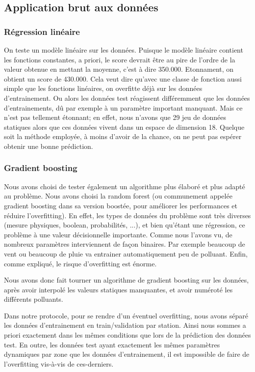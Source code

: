 \subsection{Application brut aux données}

\subsubsection{Régression linéaire}

On teste un modèle linéaire sur les données.
Puisque le modèle linéaire contient les fonctions constantes, a priori, le score devrait être au pire de l'ordre de la valeur obtenue en mettant la moyenne, c'est à dire 350.000.
Etonnament, on obtient un score de 430.000.
Cela veut dire qu'avec une classe de fonction aussi simple que les fonctions linéaires, on overfitte déjà sur les données d'entrainement. Ou alors les données test réagissent différemment que les données d'entrainements, dû par exemple à un paramètre important manquant. 
Mais ce n'est pas tellement étonnant; en effet, nous n'avons que 29 jeu de données statiques alors que ces données vivent dans un espace de dimension 18.
Quelque soit la méthode employée, à moins d'avoir de la chance, on ne peut pas espérer obtenir une bonne prédiction. %

\subsubsection{Gradient boosting}

Nous avons choisi de tester également un algorithme plus élaboré et plus adapté au problème. Nous avons choisi la random forest (ou communement appelée gradient boosting dans sa version boostée, pour améliorer les performances et réduire l'overfitting). En effet, les types de données du problème sont très diverses (mesure physiques, boolean, probabilités, ...), et bien qu'étant une régression, ce problème à une valeur décisionnelle importante. Comme nous l'avons vu, de nombreux paramètres interviennent de façon binaires. Par exemple beaucoup de vent ou beaucoup de pluie va entrainer automatiquement peu de polluant. Enfin, comme expliqué, le risque d'overfitting est énorme.

Nous avons donc fait tourner un algorithme de gradient boosting sur les données, après avoir interpolé les valeurs statiques manquantes, et avoir numéroté les différents polluants.

Dans notre protocole, pour se rendre d'un éventuel overfitting, nous avons séparé les données d'entrainement en train/validation par station. Ainsi nous sommes a priori exactement dans les mêmes conditions que lors de la prédiction des données test. En outre, les données test ayant exactement les mêmes paramètres dynamiques par zone que les données d'entrainement, il est impossible de faire de l'overfitting vis-à-vis de ces-derniers.

